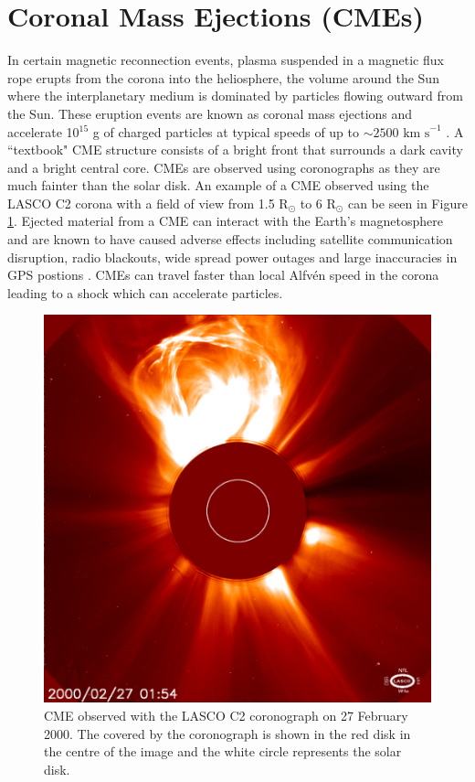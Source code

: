 \section{Coronal Mass Ejections (CMEs)}
\label{subsec:CMEs}
In certain magnetic reconnection events, plasma suspended in a magnetic flux rope erupts from the corona into the heliosphere, the volume around the Sun where the interplanetary medium is dominated by particles flowing outward from the Sun. These eruption events are known as coronal mass ejections and accelerate 10$^{15}$ g of charged particles at typical speeds of up to $\sim 2500 \mbox{ km s}^{-1}$ \citep{Gopalswamy2000}. A ``textbook" CME structure consists of a bright front that surrounds a dark cavity and a bright central core. CMEs are observed using coronographs as they are much fainter than the solar disk. An example of a CME observed using the LASCO C2 corona with a field of view from 1.5 R$_\odot$ to 6 R$_\odot$ can be seen in Figure \ref{fig:CME}. Ejected material from a CME can interact with the Earth's magnetosphere and are known to have caused adverse effects including satellite communication disruption, radio blackouts, wide spread power outages and large inaccuracies in GPS postions \citep{Eastwood2017}. CMEs can travel faster than local Alfv\'{e}n speed in the corona leading to a shock which can accelerate particles. 

\begin{figure}[ht]
    \centering
    \includegraphics[width=0.75\columnwidth]{Images/LASCO_C2_CME.jpg}
    \caption[CME observed with the LASCO C2 coronograph on 27 February 2000.]{CME observed with the LASCO C2 coronograph on 27 February 2000. The covered by the coronograph is shown in the red disk in the centre of the image and the white circle represents the solar disk.}
    \label{fig:CME}
\end{figure}

